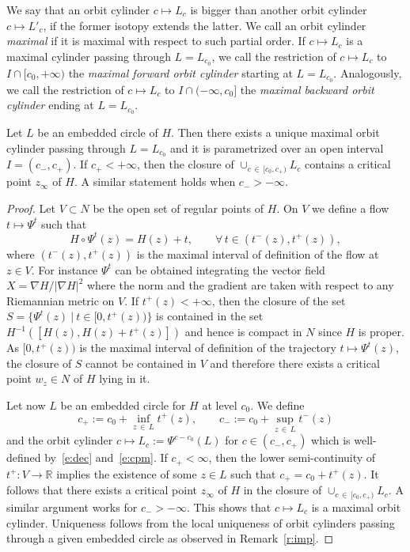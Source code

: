 \documentclass[AHL,Unicode,longabstracts,published]{cedram}
\newcommand{\R}{\mathbb{R}}
\let\oldforall\forall
\renewcommand*{\forall}{\mathrel{\oldforall}}
\begin{document}
\begin{defi}
We say that an orbit cylinder $c\mapsto L_c$ is bigger than another orbit cylinder $c\mapsto L'_c$, if the former isotopy extends the latter. We call an orbit cylinder \emph{maximal} if it is maximal with respect to such partial order. If $c\mapsto L_c$ is a maximal cylinder passing through $L=L_{c_0}$, we call the restriction of $c\mapsto L_c$ to $I\cap[c_0,+\infty)$ the \emph{maximal forward orbit cylinder} starting at $L=L_{c_0}$. Analogously, we call the restriction of $c\mapsto L_c$ to $I\cap(-\infty,c_0]$ the \emph{maximal backward orbit cylinder} ending at $L=L_{c_0}$.
\end{defi}

\begin{lemm}\label{l:emb}
Let $L$ be an embedded circle of $H$. Then there exists a unique maximal orbit cylinder passing through $L=L_{c_0}$ and it is parametrized over an open interval $I=(c_-,c_+)$. If $c_+<+\infty$, then the closure of $\cup_{c\,\in\,[c_0,c_+)}L_c$ contains a critical point $z_\infty$ of $H$. A similar statement holds when $c_->-\infty$.
\end{lemm}

\begin{proof}
Let $V\subset N$ be the open set of regular points of $H$. On $V$ we define a flow $t\mapsto\Psi^t$ such that
\begin{equation}\label{e:dec}
H\circ\Psi^t(z)=H(z)+t,\qquad \forall\,t\in\left(t^-(z),t^+(z)\right),
\end{equation}
where $(t^-(z),t^+(z))$ is the maximal interval of definition of the flow at $z\in V$. For instance $\Psi^t$ can be obtained integrating the vector field $X=\nabla H/|\nabla H|^2$ where the norm and the gradient are taken with respect to any Riemannian metric on $V$. If $t^+(z)<+\infty$, then the closure of the set $S=\{\Psi^t(z)\ |\ t\in[0,t^+(z))\}$ is contained in the set $H^{-1}([H(z),H(z)+t^+(z)])$ and hence is compact in $N$ since $H$ is proper. As $[0,t^+(z))$ is the maximal interval of definition of the trajectory $t\mapsto\Psi^t(z)$, the closure of $S$ cannot be contained in $V$ and therefore there exists a critical point $w_z\in N$ of $H$ lying in it.

Let now $L$ be an embedded circle for $H$ at level $c_0$. We define
\begin{equation}\label{e:cpm}
c_+:=c_0+\inf_{z\,\in\,L}t^+(z),\qquad c_-:=c_0+\sup_{z\,\in\,L}t^-(z)
\end{equation}
and the orbit cylinder $c\mapsto L_c:=\Psi^{c-c_0}(L)$ for $c\in(c_-,c_+)$ which is well-defined by~\eqref{e:dec} and~\eqref{e:cpm}. If $c_+<\infty$, then the lower semi-continuity of $t^+:V\to\R$ implies the existence of some $z\in L$ such that $c_+=c_0+t^+(z)$. It follows that there exists a critical point $z_\infty$ of $H$ in the closure of $\cup_{c\,\in\,[c_0,c_+)}L_c$. A similar argument works for $c_->-\infty$. This shows that $c\mapsto L_c$ is a maximal orbit cylinder. Uniqueness follows from the local uniqueness of orbit cylinders passing through a given embedded circle as observed in Remark~\ref{r:imp}.
\end{proof}
\end{document}
